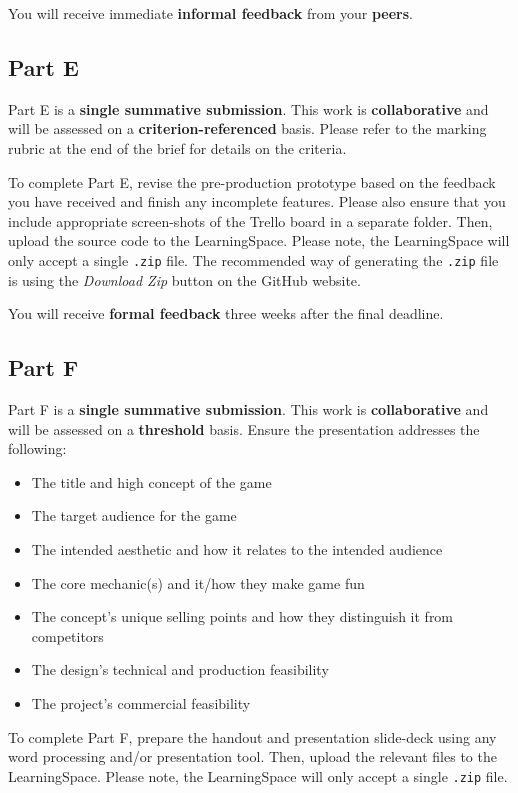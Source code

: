 \documentclass{../../fal_assignment}
\begin{document}
You will receive immediate \textbf{informal feedback} from your \textbf{peers}.

\subsection*{Part E}

Part E is a \textbf{single summative submission}. This work is \textbf{collaborative} and will be assessed on a \textbf{criterion-referenced} basis. Please refer to the marking rubric at the end of the brief for details on the criteria.

To complete Part E, revise the pre-production prototype based on the feedback you have received and finish any incomplete features. Please also ensure that you include appropriate screen-shots of the Trello board in a separate folder. Then, upload the source code to the LearningSpace. Please note, the LearningSpace will only accept a single \texttt{.zip} file. The recommended way of generating the \texttt{.zip} file is using the \textit{Download Zip} button on the GitHub website.

You will receive \textbf{formal feedback} three weeks after the final deadline.

\subsection*{Part F}

Part F is a \textbf{single summative submission}. This work is \textbf{collaborative} and will be assessed on a \textbf{threshold} basis. Ensure the presentation addresses the following:

\begin{itemize}
	\item The title and high concept of the game
	\item The target audience for the game
	\item The intended aesthetic and how it relates to the intended audience
	\item The core mechanic(s) and it/how they make game fun
	\item The concept's unique selling points and how they distinguish it from competitors
	\item The design's technical and production feasibility
	\item The project's commercial feasibility
\end{itemize}

To complete Part F, prepare the handout and presentation slide-deck using any word processing and/or presentation tool. Then, upload the relevant files to the LearningSpace. Please note, the LearningSpace will only accept a single \texttt{.zip} file.
\end{document}
